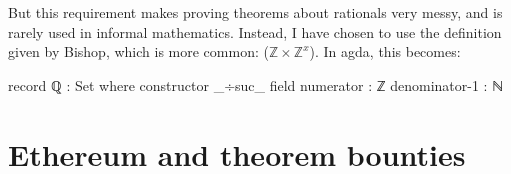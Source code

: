 \documentclass[11pt,a4paper]{article}
\begin{document}
But this requirement makes proving theorems about rationals very messy, and is rarely used in informal mathematics. Instead, I have chosen to use the definition given by Bishop, which is more common: ($ℤ \times ℤ^x$). In agda, this becomes:
\begin{code}
record ℚ : Set where
  constructor _÷suc_
  field
    numerator     : ℤ
    denominator-1 : ℕ
\end{code}


\section{Ethereum and theorem bounties}



\end{document}
